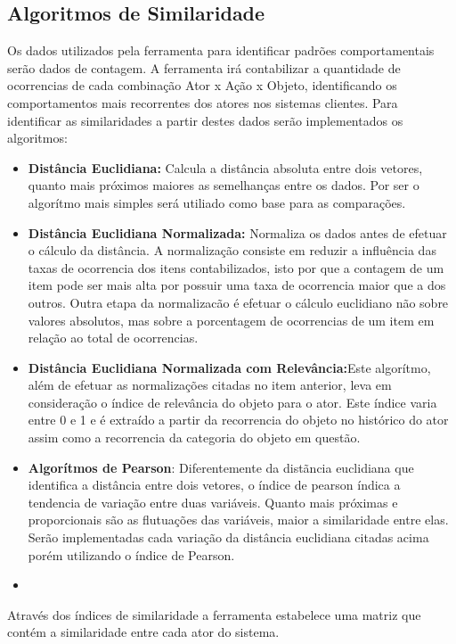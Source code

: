 \documentclass[
	12pt,				%
    oneside,			%
	a4paper,			%
	english,			%
	french,				%
	spanish,			%
	brazil,				%
	]{abntex2}
\begin{document}
\subsection{Algoritmos de Similaridade}
Os dados utilizados pela ferramenta para identificar padrões comportamentais serão dados de contagem. A ferramenta irá contabilizar a quantidade de ocorrencias de cada combinação Ator x Ação x Objeto, identificando
os comportamentos mais recorrentes dos atores nos sistemas clientes. Para identificar as similaridades a partir destes dados serão implementados os algoritmos:

\begin{itemize}
	\item \textbf{Distância Euclidiana:} Calcula a distância absoluta entre dois vetores, quanto mais próximos maiores as semelhanças entre os dados. Por ser o algorítmo mais simples será utiliado como base para as comparações.
	\item \textbf{Distância Euclidiana Normalizada:} Normaliza os dados antes de efetuar o cálculo da distância. A normalização consiste em reduzir a influência das taxas de ocorrencia dos itens contabilizados, isto por que a contagem de um item
	pode ser mais alta por possuir uma taxa de ocorrencia maior que a dos outros. Outra etapa da normalizacão é efetuar o cálculo euclidiano não sobre valores absolutos, mas sobre a porcentagem de ocorrencias de um item em relação ao total de ocorrencias.
	\item \textbf{Distância Euclidiana Normalizada com Relevância:}Este algorítmo, além de efetuar as normalizações citadas no item anterior, leva em consideração o índice de relevância do objeto para o ator. Este índice varia entre 0 e 1 e é extraído a 
	partir da recorrencia do objeto no histórico do ator assim como a recorrencia da categoria do objeto em questão.
	\item \textbf{Algorítmos de Pearson}: Diferentemente da distãncia euclidiana que identifica a distância entre dois vetores, o índice de pearson índica a tendencia de variação entre duas variáveis. Quanto mais próximas e proporcionais são as flutuações 
	das variáveis, maior a similaridade entre elas. Serão implementadas cada variação da distância euclidiana citadas acima porém utilizando o índice de Pearson.
	\item 
\end{itemize}

Através dos índices de similaridade a ferramenta estabelece uma matriz que contém a similaridade entre cada ator do sistema.
\end{document}
